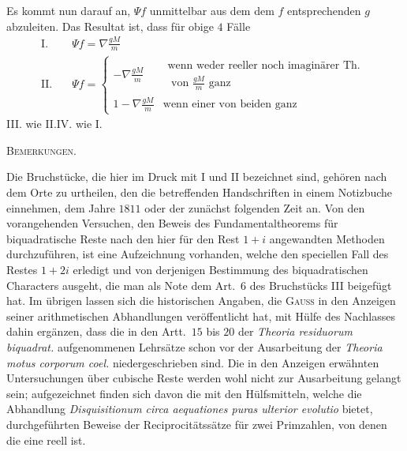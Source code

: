 Es kommt nun darauf an, $\Psi f$ unmittelbar aus dem dem $f$ entsprechenden $g$ abzuleiten. Das Resultat ist, dass für obige $4$ Fälle
\[
\begin{aligned}
\mathrm{I.}\quad&\Psi f=\nabla\frac{gM}{m}\\
\mathrm{II.}\quad&\Psi f=\left\{\begin{array}{ll}
-\nabla\frac{gM}{m}&\begin{gathered}\text{wenn weder reeller noch imaginärer Th.}\\\text{ von }\frac{gM}{m}\text{ ganz}\end{gathered}\\
1-\nabla\frac{gM}{m}&\text{wenn einer von beiden ganz}
\end{array}\right.
\end{aligned}
\]
III. wie II.\quad IV. wie I.

%
\par\bigskip{}
\begin{center}\large\scshape Bemerkungen.\end{center}
Die Bruchstücke, die hier im Druck mit I und II bezeichnet sind, gehören nach dem Orte zu urtheilen, den die betreffenden Handschriften in einem Notizbuche einnehmen, dem Jahre $1811$ oder der zunächst folgenden Zeit an. Von den vorangehenden Versuchen, den Beweis des Fundamentaltheorems für biquadratische Reste nach den hier für den Rest $1+i$ angewandten Methoden durchzuführen, ist eine Aufzeichnung vorhanden, welche den speciellen Fall des Restes $1+2i$ erledigt und von derjenigen Bestimmung des biquadratischen Characters ausgeht, die man als Note dem Art.\ $6$ des Bruchstücks III beigefügt hat. Im übrigen lassen sich die historischen Angaben, die \textsc{Gauss} in den Anzeigen seiner arithmetischen Abhandlungen veröffentlicht hat, mit Hülfe des Nachlasses dahin ergänzen, dass die in den Artt.\ $15$ bis $20$ der \emph{Theoria residuorum biquadrat.} aufgenommenen Lehrsätze schon vor der Ausarbeitung der \emph{Theoria motus corporum coel.} niedergeschrieben sind. Die in den Anzeigen erwähnten Untersuchungen über cubische Reste werden wohl nicht zur Ausarbeitung gelangt sein; aufgezeichnet finden sich davon die mit den Hülfsmitteln, welche die Abhandlung \emph{Disquisitionum circa aequationes puras ulterior evolutio} bietet, durchgeführten Beweise der Reciprocitätssätze für zwei Primzahlen, von denen die eine reell ist.

